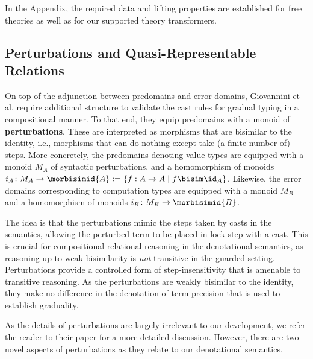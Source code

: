 \documentclass[acmsmall,screen,review,anonymous]{acmart}
\theoremstyle{remark}
\begin{document}
In the Appendix, the required data and lifting properties are established for
free theories as well as for our supported theory transformers.

\subsection{Perturbations and Quasi-Representable Relations}\label{sec:perturbations}

On top of the adjunction between predomains and error domains, Giovannini et al.
require additional structure to validate the cast rules for gradual typing in a
compositional manner.
%
%
To that end, they equip predomains with a monoid of \textbf{perturbations}.
These are interpreted as morphisms that are bisimilar to the identity, i.e.,
morphisms that can do nothing except take (a finite number of) steps.
%
More concretely, the predomains denoting value types are equipped with a monoid
$M_A$ of syntactic perturbations, and a homomorphism of monoids $i_A \colon M_A
\to \morbisimid{A} := \{ f : A \to A \mid f \bisim \id_A \}$. Likewise, the
error domains corresponding to computation types are equipped with a monoid
$M_B$ and a homomorphism of monoids $i_B \colon M_B \to \morbisimid{B}$.

The idea is that the perturbations mimic the steps taken by casts in the
semantics, allowing the perturbed term to be placed in lock-step with a cast.
This is crucial for compositional relational reasoning in the denotational
semantics, as reasoning up to weak bisimilarity is \emph{not} transitive in the
guarded setting. Perturbations provide a controlled form of step-insensitivity
that is amenable to transitive reasoning. As the perturbations are weakly
bisimilar to the identity, they make no difference in the denotation of term
precision that is used to establish graduality.


As the details of perturbations are largely irrelevant to our development, we
refer the reader to their paper \cite{gtt-sgdt} for a more detailed discussion.
However, there are two novel aspects of perturbations as they relate to our
denotational semantics.
\end{document}
